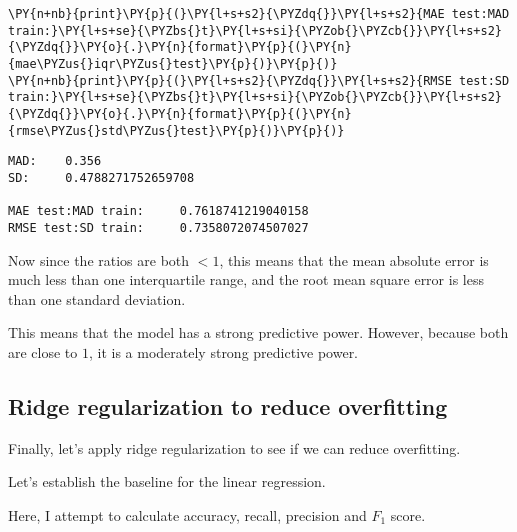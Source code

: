 \begin{tcolorbox}[breakable, size=fbox, boxrule=1pt, pad at break*=1mm,colback=cellbackground, colframe=cellborder]
\begin{Verbatim}[commandchars=\\\{\}]
\PY{n+nb}{print}\PY{p}{(}\PY{l+s+s2}{\PYZdq{}}\PY{l+s+s2}{MAE test:MAD train:}\PY{l+s+se}{\PYZbs{}t}\PY{l+s+si}{\PYZob{}\PYZcb{}}\PY{l+s+s2}{\PYZdq{}}\PY{o}{.}\PY{n}{format}\PY{p}{(}\PY{n}{mae\PYZus{}iqr\PYZus{}test}\PY{p}{)}\PY{p}{)}
\PY{n+nb}{print}\PY{p}{(}\PY{l+s+s2}{\PYZdq{}}\PY{l+s+s2}{RMSE test:SD train:}\PY{l+s+se}{\PYZbs{}t}\PY{l+s+si}{\PYZob{}\PYZcb{}}\PY{l+s+s2}{\PYZdq{}}\PY{o}{.}\PY{n}{format}\PY{p}{(}\PY{n}{rmse\PYZus{}std\PYZus{}test}\PY{p}{)}\PY{p}{)}
\end{Verbatim}
\end{tcolorbox}

    \begin{Verbatim}[commandchars=\\\{\}]
MAD:    0.356
SD:     0.4788271752659708

MAE test:MAD train:     0.7618741219040158
RMSE test:SD train:     0.7358072074507027
    \end{Verbatim}

    Now since the ratios are both \(< 1\), this means that the mean absolute
error is much less than one interquartile range, and the root mean
square error is less than one standard deviation.

This means that the model has a strong predictive power. However,
because both are close to \(1\), it is a moderately strong predictive
power.

    \hypertarget{ridge-regularization-to-reduce-overfitting}{%
\subsection{Ridge regularization to reduce
overfitting}\label{ridge-regularization-to-reduce-overfitting}}

Finally, let's apply ridge regularization to see if we can reduce
overfitting.

Let's establish the baseline for the linear regression.

    Here, I attempt to calculate accuracy, recall, precision and \(F_1\)
score.

